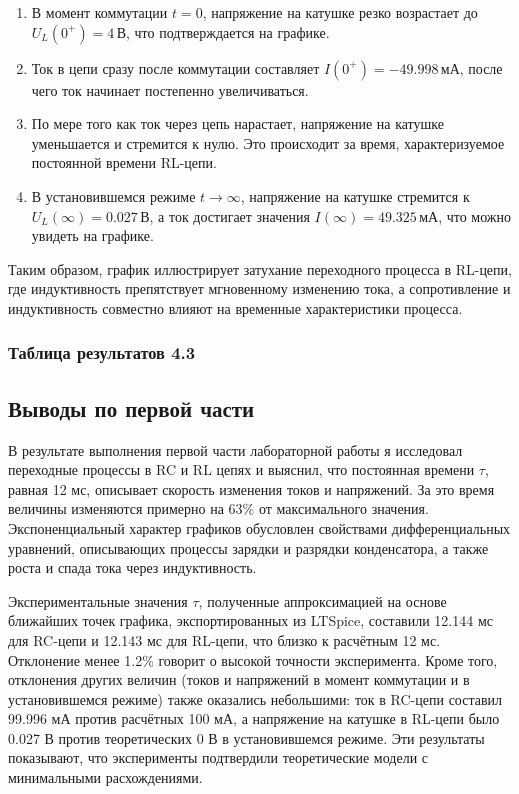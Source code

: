 \begin{enumerate}[noitemsep,topsep=0pt,left=6pt,label=\arabic*.]
	\item В момент коммутации \( t = 0 \), напряжение на катушке резко возрастает до \( U_L(0^+) = 4 \, \text{В} \), что подтверждается на графике.
	\item Ток в цепи сразу после коммутации составляет \( I(0^+) = -49.998 \, \text{мА} \), после чего ток начинает постепенно увеличиваться.
	\item По мере того как ток через цепь нарастает, напряжение на катушке уменьшается и стремится к нулю. Это происходит за время, характеризуемое постоянной времени RL-цепи.
	\item В установившемся режиме \( t \to \infty \), напряжение на катушке стремится к \( U_L(\infty) = 0.027 \, \text{В} \), а ток достигает значения \( I(\infty) = 49.325 \, \text{мА} \), что можно увидеть на графике.
\end{enumerate}

Таким образом, график иллюстрирует затухание переходного процесса в RL-цепи, где индуктивность препятствует мгновенному изменению тока, а сопротивление и индуктивность совместно влияют на временные характеристики процесса.


\subsubsection{Таблица результатов 4.3}





\subsection{Выводы по первой части}

В результате выполнения первой части лабораторной работы я исследовал переходные процессы в RC и RL цепях и выяснил, что постоянная времени \(\tau\), равная 12 мс, описывает скорость изменения токов и напряжений. За это время величины изменяются примерно на 63\% от максимального значения. Экспоненциальный характер графиков обусловлен свойствами дифференциальных уравнений, описывающих процессы зарядки и разрядки конденсатора, а также роста и спада тока через индуктивность.

Экспериментальные значения \(\tau\), полученные аппроксимацией на основе ближайших точек графика, экспортированных из LTSpice, составили 12.144 мс для RC-цепи и 12.143 мс для RL-цепи, что близко к расчётным 12 мс. Отклонение менее 1.2\% говорит о высокой точности эксперимента. Кроме того, отклонения других величин (токов и напряжений в момент коммутации и в установившемся режиме) также оказались небольшими: ток в RC-цепи составил 99.996 мА против расчётных 100 мА, а напряжение на катушке в RL-цепи было 0.027 В против теоретических 0 В в установившемся режиме. Эти результаты показывают, что эксперименты подтвердили теоретические модели с минимальными расхождениями.

